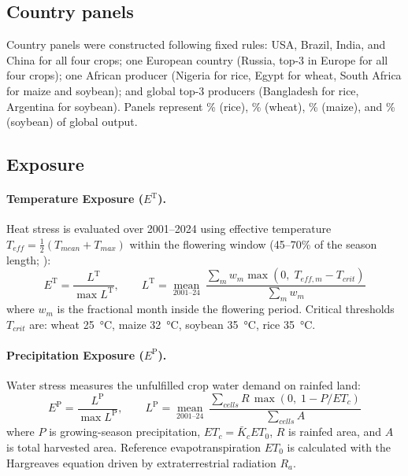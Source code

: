 \documentclass[11pt,a4paper]{article}
\let\parencite\citep
\newcommand{\TT}{\mathrm{T}}   %
\newcommand{\PP}{\mathrm{P}}   %
\begin{document}
\subsection{Country panels}
Country panels were constructed following fixed rules: USA, Brazil, India, and China for all four crops; one European country (Russia, top-3 in Europe for all four crops); one African producer (Nigeria for rice, Egypt for wheat, South Africa for maize and soybean); and global top-3 producers (Bangladesh for rice, Argentina for soybean). Panels represent \panelShareRice\% (rice), \panelShareWheat\% (wheat), \panelShareMaize\% (maize), and \panelShareSoybean\% (soybean) of global output.

\begin{table}[H]\centering\scriptsize

\caption{Panels. Rank: global production rank; Share: \% of world production; Class: primary K\"oppen group (+M for mountain elevation $\ge 1000$\,m).}
\end{table}

\subsection{Exposure}
\paragraph{Temperature Exposure ($E^{\TT}$).} Heat stress is evaluated over 2001--2024 using effective temperature $T_{eff} = \tfrac12(T_{mean}+T_{max})$ within the flowering window (45--70\% of the season length; \citealt{deryng2014}):
\begin{equation}
E^{\TT} = \frac{L^{\TT}}{\max L^{\TT}},\qquad L^{\TT} = \operatorname*{mean}_{2001\text{--}24}\ \frac{\sum_m w_m \max(0,\; T_{eff,m} - T_{crit})}{\sum_m w_m}
\end{equation}
where $w_m$ is the fractional month inside the flowering period. Critical thresholds $T_{crit}$ are: wheat \SI{25}{\celsius}, maize \SI{32}{\celsius}, soybean \SI{35}{\celsius}, rice \SI{35}{\celsius}.

\paragraph{Precipitation Exposure ($E^{\PP}$).} Water stress measures the unfulfilled crop water demand on rainfed land:
\begin{equation}
E^{\PP} = \frac{L^{\PP}}{\max L^{\PP}},\qquad L^{\PP} = \operatorname*{mean}_{2001\text{--}24}\ \frac{\sum_{cells} R\,\max(0,\; 1 - P/ET_c)}{\sum_{cells} A}
\end{equation}
where $P$ is growing-season precipitation, $ET_c = \bar{K}_c ET_0$, $R$ is rainfed area, and $A$ is total harvested area. Reference evapotranspiration $ET_0$ is calculated with the Hargreaves equation \parencite{fao56} driven by extraterrestrial radiation $R_a$.
\end{document}
